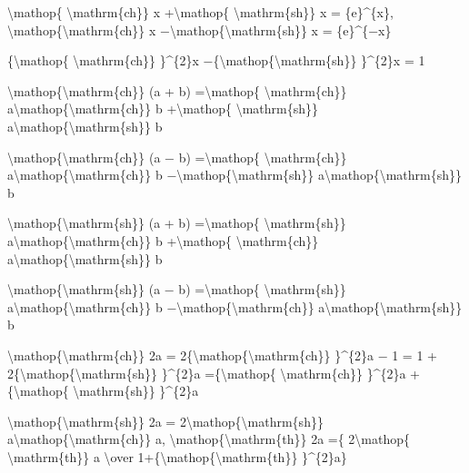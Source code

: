 \documentclass[]{article}
\begin{document}
\textbackslash{}mathop\{ \textbackslash{}mathrm\{ch\}\} x
+\textbackslash{}mathop\{ \textbackslash{}mathrm\{sh\}\} x =
\{e\}\^{}\{x\}, \textbackslash{}mathop\{\textbackslash{}mathrm\{ch\}\} x
−\textbackslash{}mathop\{\textbackslash{}mathrm\{sh\}\} x =
\{e\}\^{}\{−x\}

\{\textbackslash{}mathop\{ \textbackslash{}mathrm\{ch\}\} \}\^{}\{2\}x
−\{\textbackslash{}mathop\{\textbackslash{}mathrm\{sh\}\} \}\^{}\{2\}x =
1

\textbackslash{}mathop\{\textbackslash{}mathrm\{ch\}\} (a + b)
=\textbackslash{}mathop\{ \textbackslash{}mathrm\{ch\}\}
a\textbackslash{}mathop\{\textbackslash{}mathrm\{ch\}\} b
+\textbackslash{}mathop\{ \textbackslash{}mathrm\{sh\}\}
a\textbackslash{}mathop\{\textbackslash{}mathrm\{sh\}\} b

\textbackslash{}mathop\{\textbackslash{}mathrm\{ch\}\} (a − b)
=\textbackslash{}mathop\{ \textbackslash{}mathrm\{ch\}\}
a\textbackslash{}mathop\{\textbackslash{}mathrm\{ch\}\} b
−\textbackslash{}mathop\{\textbackslash{}mathrm\{sh\}\}
a\textbackslash{}mathop\{\textbackslash{}mathrm\{sh\}\} b

\textbackslash{}mathop\{\textbackslash{}mathrm\{sh\}\} (a + b)
=\textbackslash{}mathop\{ \textbackslash{}mathrm\{sh\}\}
a\textbackslash{}mathop\{\textbackslash{}mathrm\{ch\}\} b
+\textbackslash{}mathop\{ \textbackslash{}mathrm\{ch\}\}
a\textbackslash{}mathop\{\textbackslash{}mathrm\{sh\}\} b

\textbackslash{}mathop\{\textbackslash{}mathrm\{sh\}\} (a − b)
=\textbackslash{}mathop\{ \textbackslash{}mathrm\{sh\}\}
a\textbackslash{}mathop\{\textbackslash{}mathrm\{ch\}\} b
−\textbackslash{}mathop\{\textbackslash{}mathrm\{ch\}\}
a\textbackslash{}mathop\{\textbackslash{}mathrm\{sh\}\} b

\textbackslash{}mathop\{\textbackslash{}mathrm\{ch\}\} 2a =
2\{\textbackslash{}mathop\{\textbackslash{}mathrm\{ch\}\} \}\^{}\{2\}a −
1 = 1 + 2\{\textbackslash{}mathop\{\textbackslash{}mathrm\{sh\}\}
\}\^{}\{2\}a =\{\textbackslash{}mathop\{ \textbackslash{}mathrm\{ch\}\}
\}\^{}\{2\}a +\{\textbackslash{}mathop\{ \textbackslash{}mathrm\{sh\}\}
\}\^{}\{2\}a

\textbackslash{}mathop\{\textbackslash{}mathrm\{sh\}\} 2a =
2\textbackslash{}mathop\{\textbackslash{}mathrm\{sh\}\}
a\textbackslash{}mathop\{\textbackslash{}mathrm\{ch\}\} a,
\textbackslash{}mathop\{\textbackslash{}mathrm\{th\}\} 2a =\{
2\textbackslash{}mathop\{ \textbackslash{}mathrm\{th\}\} a
\textbackslash{}over
1+\{\textbackslash{}mathop\{\textbackslash{}mathrm\{th\}\}
\}\^{}\{2\}a\}
\end{document}
